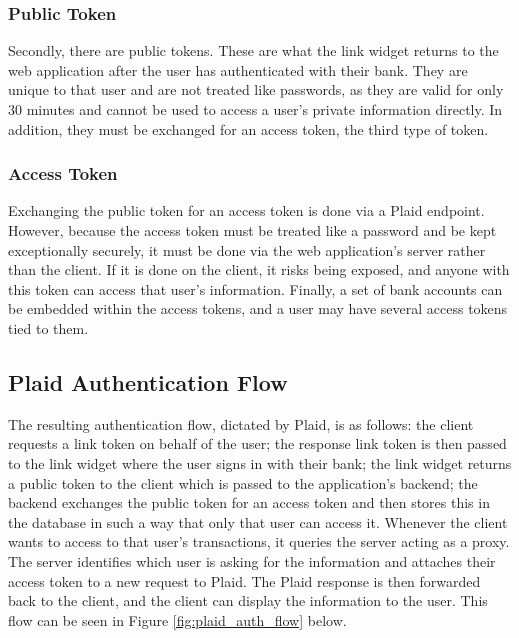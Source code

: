 \subsubsection{Public Token}
Secondly, there are public tokens. These are what the link widget returns to the web application after the user has authenticated with their bank. They are unique to that user and are not treated like passwords, as they are valid for only 30 minutes and cannot be used to access a user's private information directly. In addition, they must be exchanged for an access token, the third type of token.

\subsubsection{Access Token}
Exchanging the public token for an access token is done via a Plaid endpoint. However, because the access token must be treated like a password and be kept exceptionally securely, it must be done via the web application's server rather than the client. If it is done on the client, it risks being exposed, and anyone with this token can access that user's information. Finally, a set of bank accounts can be embedded within the access tokens, and a user may have several access tokens tied to them.

\subsection{Plaid Authentication Flow}
The resulting authentication flow, dictated by Plaid, is as follows: the client requests a link token on behalf of the user; the response link token is then passed to the link widget where the user signs in with their bank; the link widget returns a public token to the client which is passed to the application's backend; the backend exchanges the public token for an access token and then stores this in the database in such a way that only that user can access it. Whenever the client wants to access to that user's transactions, it queries the server acting as a proxy. The server identifies which user is asking for the information and attaches their access token to a new request to Plaid. The Plaid response is then forwarded back to the client, and the client can display the information to the user. This flow can be seen in Figure \ref{fig:plaid_auth_flow} below.

